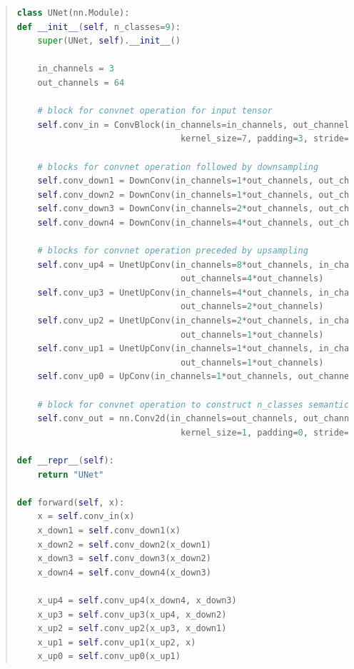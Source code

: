 \documentclass[11pt]{article}
\begin{document}
\begin{quote}
\begin{lstlisting}[language=Python, basicstyle=\scriptsize]
class UNet(nn.Module):
def __init__(self, n_classes=9):
    super(UNet, self).__init__()

    in_channels = 3
    out_channels = 64

    # block for convnet operation for input tensor
    self.conv_in = ConvBlock(in_channels=in_channels, out_channels=out_channels, 
                                kernel_size=7, padding=3, stride=2)

    # blocks for convnet operation followed by downsampling
    self.conv_down1 = DownConv(in_channels=1*out_channels, out_channels=1*out_channels)
    self.conv_down2 = DownConv(in_channels=1*out_channels, out_channels=2*out_channels)
    self.conv_down3 = DownConv(in_channels=2*out_channels, out_channels=4*out_channels)
    self.conv_down4 = DownConv(in_channels=4*out_channels, out_channels=8*out_channels)

    # blocks for convnet operation preceded by upsampling
    self.conv_up4 = UnetUpConv(in_channels=8*out_channels, in_channels_skip=4*out_channels, 
                                out_channels=4*out_channels)
    self.conv_up3 = UnetUpConv(in_channels=4*out_channels, in_channels_skip=2*out_channels, 
                                out_channels=2*out_channels)
    self.conv_up2 = UnetUpConv(in_channels=2*out_channels, in_channels_skip=1*out_channels, 
                                out_channels=1*out_channels)
    self.conv_up1 = UnetUpConv(in_channels=1*out_channels, in_channels_skip=1*out_channels, 
                                out_channels=1*out_channels)
    self.conv_up0 = UpConv(in_channels=1*out_channels, out_channels=1*out_channels)
    
    # block for convnet operation to construct n_classes semantic outputs
    self.conv_out = nn.Conv2d(in_channels=out_channels, out_channels=n_classes, 
                                kernel_size=1, padding=0, stride=1)

def __repr__(self):
    return "UNet"        

def forward(self, x):
    x = self.conv_in(x)
    x_down1 = self.conv_down1(x)
    x_down2 = self.conv_down2(x_down1)
    x_down3 = self.conv_down3(x_down2)
    x_down4 = self.conv_down4(x_down3)

    x_up4 = self.conv_up4(x_down4, x_down3)
    x_up3 = self.conv_up3(x_up4, x_down2)
    x_up2 = self.conv_up2(x_up3, x_down1)
    x_up1 = self.conv_up1(x_up2, x)
    x_up0 = self.conv_up0(x_up1)


\end{lstlisting}
\end{quote}
\end{document}
